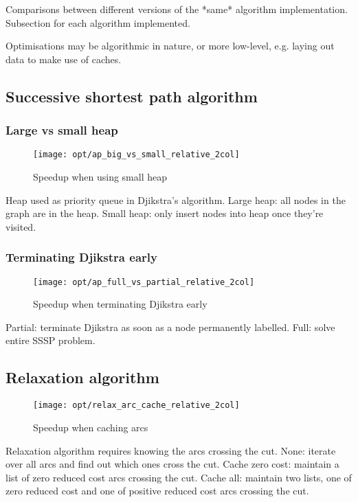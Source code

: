 Comparisons between different versions of the *same* algorithm implementation. Subsection for each algorithm implemented.

Optimisations may be algorithmic in nature, or more low-level, e.g. laying out data to make use of caches.

\subsection{Successive shortest path algorithm}

\subsubsection{Large vs small heap}

\begin{figure}
  \centering
  \texttt{[image: opt/ap\_big\_vs\_small\_relative\_2col]}
  \caption{Speedup when using small heap}
  \label{fig:opt-ap-big-vs-small}
\end{figure}

Heap used as priority queue in Djikstra's algorithm. Large heap: all nodes in the graph are in the heap. Small heap: only insert nodes into heap once they're visited.

\subsubsection{Terminating Djikstra early}

\begin{figure}
    \centering
    \texttt{[image: opt/ap\_full\_vs\_partial\_relative\_2col]}
    \caption{Speedup when terminating Djikstra early}
    \label{fig:opt-ap-terminate-djikstra-early}
\end{figure}

Partial: terminate Djikstra as soon as a node permanently labelled. Full: solve entire SSSP problem.

\subsection{Relaxation algorithm}

\begin{figure}
    \centering
    \texttt{[image: opt/relax\_arc\_cache\_relative\_2col]}
    \caption{Speedup when caching arcs}
    \label{fig:opt-relax-cache-arcs}
\end{figure}

Relaxation algorithm requires knowing the arcs crossing the cut. None: iterate over all arcs and find out which ones cross the cut. Cache zero cost: maintain a list of zero reduced cost arcs crossing the cut. Cache all: maintain two lists, one of zero reduced cost and one of positive reduced cost arcs crossing the cut.

